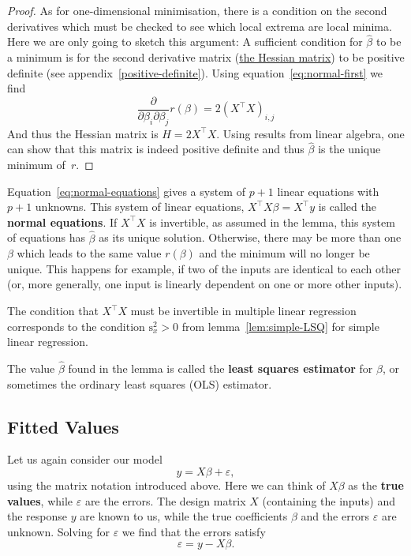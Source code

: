 \documentclass[
  a4paper,
]{article}
\theoremstyle{definition}
\theoremstyle{definition}
\theoremstyle{definition}
\theoremstyle{definition}
\theoremstyle{remark}
\begin{document}
\begin{proof}
As for one-dimensional minimisation, there is a condition on the
second derivatives which must be checked to see which local extrema
are local minima. Here we are only going to sketch this argument: A
sufficient condition for \(\hat\beta\) to be a minimum is for the
second derivative matrix (\href{https://en.wikipedia.org/wiki/Hessian_matrix}{the Hessian
matrix})
to be positive definite (see appendix~\ref{positive-definite}).
Using equation~\eqref{eq:normal-first} we find
\begin{equation*}
    \frac{\partial}{\partial\beta_i \partial\beta_j} r(\beta)
    = 2 (X^\top X)_{i,j}
  \end{equation*}
And thus the Hessian matrix is \(H = 2 X^\top X\). Using results from
linear algebra, one can show that this matrix is indeed positive
definite and thus \(\hat\beta\) is the unique minimum of~\(r\).
\end{proof}

Equation~\eqref{eq:normal-equations} gives a system of \(p+1\) linear
equations with \(p+1\) unknowns. This system of linear equations,
\(X^\top X \beta = X^\top y\) is called the \textbf{normal equations}.
If \(X^\top X\) is invertible, as assumed in the lemma, this
system of equations has \(\hat\beta\) as its unique solution.
Otherwise, there may be more than one \(\beta\) which leads to the
same value \(r(\beta)\) and the minimum will no longer be unique.
This happens for example, if two of the inputs are identical to
each other (or, more generally, one input is linearly dependent
on one or more other inputs).

The condition that \(X^\top X\) must be invertible in multiple linear
regression corresponds to the condition \(\mathrm{s}_x^2 > 0\) from
lemma~\ref{lem:simple-LSQ} for simple linear regression.

The value \(\hat\beta\) found in the lemma is called the \textbf{least squares
estimator} for \(\beta\), or sometimes the ordinary least squares (OLS)
estimator.

\hypertarget{fitted-values}{%
\subsection{Fitted Values}\label{fitted-values}}

Let us again consider our model
\begin{equation*}
  y = X \beta + \varepsilon,
\end{equation*}
using the matrix notation introduced above. Here we can think of
\(X\beta\) as the \textbf{true values}, while \(\varepsilon\) are the errors. The
design matrix \(X\) (containing the inputs) and the response \(y\) are
known to us, while the true coefficients \(\beta\) and the errors \(\varepsilon\)
are unknown. Solving for \(\varepsilon\) we find that the errors satisfy
\begin{equation*}
  \varepsilon= y - X\beta.
\end{equation*}
\end{document}
